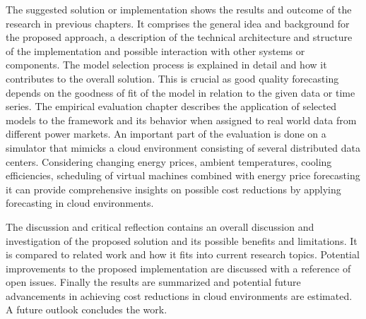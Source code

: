 The suggested solution or implementation shows the results and outcome of the research in previous chapters. It comprises the general idea and background for the proposed approach, a description of the technical architecture and structure of the implementation and possible interaction with other systems or components. The model selection process is explained in detail and how it contributes to the overall solution. This is crucial as good quality forecasting depends on the goodness of fit of the model in relation to the given data or time series. The empirical evaluation chapter describes the application of selected models to the framework and its behavior when assigned to real world data from different power markets. 
An important part of the evaluation is done on a simulator that mimicks a cloud environment consisting of several distributed data centers. Considering changing energy prices, ambient temperatures, cooling efficiencies, scheduling of virtual machines combined with energy price forecasting it can provide comprehensive insights on possible cost reductions by applying forecasting in cloud environments. 

The discussion and critical reflection contains an overall discussion and investigation of the proposed solution and its possible benefits and limitations. It is compared to related work and how it fits into current research topics. Potential improvements to the proposed implementation are discussed with a reference of open issues. 
Finally the results are summarized and potential future advancements in achieving cost reductions in cloud environments are estimated. A future outlook concludes the work. 


